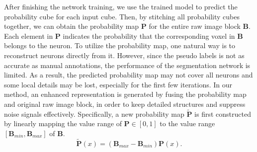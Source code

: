 After finishing the network training, we use the trained model to predict the probability cube for each input cube.
Then, by stitching all probability cubes together, we can obtain the probability map $\mathbf{P}$ for the entire raw image block $ \mathbf{B} $.
Each element in $\mathbf{P}$ indicates the probability that the corresponding voxel in $ \mathbf{B} $ belongs to the neuron.
To utilize the probability map, one natural way is to reconstruct neurons directly from it.
However, since the pseudo labels is not as accurate as manual annotations, the performance of the segmentation network is limited. As a result, the predicted probability map may not cover all neurons and some local details may be lost, especially for the first few iterations.
In our method, an enhanced representation is generated by fusing the probability map and original raw image block, in order to keep detailed structures and suppress noise signals effectively.
Specifically, a new probability map $\widetilde{\mathbf{P}} $ is first constructed by linearly mapping the value range of $ \mathbf{P}\in [0,1] $ to the value range $[\mathbf{B}_{min}, \mathbf{B}_{max}]$ of $\mathbf{B}$.
\begin{equation}
\widetilde{\mathbf{P}}(x) = (\mathbf{B}_{max}-\mathbf{B}_{min})\mathbf{P}(x).
\end{equation}


